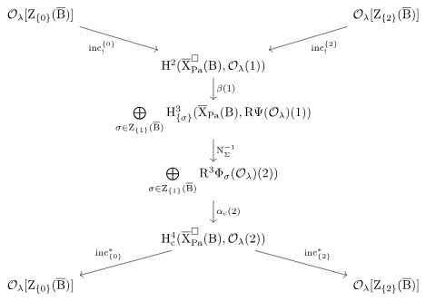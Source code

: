 \documentclass[10pt]{amsart}
\numberwithin{equation}{section}
\theoremstyle{definition}
\def\Pa{\mathrm{Pa}}
\def\calO{\mathcal{O}}
\def\rmc{\mathrm{c}}
\def\rmB{\mathrm{B}}
\def\rmH{\mathrm{H}}
\def\rmR{\mathrm{R}}
\def\rmX{\mathrm{X}}
\def\rmZ{\mathrm{Z}}
\begin{document}
\begin{equation}\label{level-raise-diagram}
\begin{tikzcd}
 \calO_{\lambda}[\rmZ_{\{0\}}(\overline{\rmB})] \arrow[rd, "\mathrm{inc}^{\{0\}}_{!}"'] &                                    &  \calO_{\lambda}[\rmZ_{\{2\}}(\overline{\rmB})]\arrow[ld, "\mathrm{inc}^{\{2\}}_{!}"] \\
                   & \rmH^{2}(\overline{\rmX}^{\square}_{\Pa}(\rmB), \calO_{\lambda}(1)) \arrow[d, "\beta(1)"]                   &                   \\
                   & \bigoplus\limits_{\sigma\in \rmZ_{\{1\}}(\overline{\rmB})}\rmH^{3}_{\{\sigma\}}(\overline{\rmX}_{\Pa}(\rmB), \rmR\Psi(\calO_{\lambda})(1)) \arrow[d, "\mathrm{N}^{-1}_{\Sigma}"]                   &                   \\
                   & \bigoplus\limits_{\sigma\in \rmZ_{\{1\}}(\overline{\rmB})}\rmR^{3}\Phi_{\sigma}(\calO_{\lambda})(2)) \arrow[d, "\alpha_{\rmc}(2)"]                   &                   \\
                   &  \rmH^{4}_{\rmc}(\overline{\rmX}^{\square}_{\Pa}(\rmB), \calO_{\lambda}(2)) \arrow[ld, "\mathrm{inc}^{\ast}_{\{0\}}"'] \arrow[rd, "\mathrm{inc}^{\ast}_{\{2\}}"] &                   \\
 \calO_{\lambda}[\rmZ_{\{0\}}(\overline{\rmB})]            &                                    &   \calO_{\lambda}[\rmZ_{\{2\}}(\overline{\rmB})]            
\end{tikzcd}
\end{equation}
\end{document}
